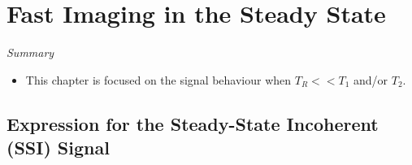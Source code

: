 \section{Fast Imaging in the Steady State}
\label{ch:18}

\textit{Summary}
\begin{itemize}
    \item This chapter is focused on the signal behaviour when $T_R << T_1$ and/or $T_2$.
\end{itemize}

\subsection{Expression for the Steady-State Incoherent (SSI) Signal}


